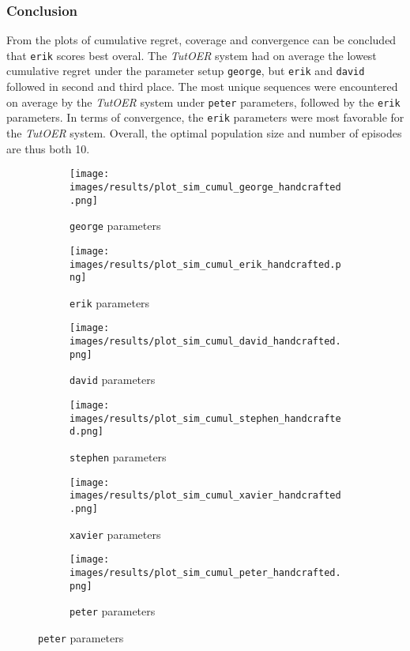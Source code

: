 \subsubsection*{Conclusion}
From the plots of cumulative regret, coverage and convergence can
be concluded that \texttt{erik} scores best overal. The \emph{TutOER} system
had on average the lowest cumulative regret under the parameter setup
\texttt{george}, but \texttt{erik} and \texttt{david} followed in second and
third place. The most unique sequences were encountered on average by the
\emph{TutOER} system under \texttt{peter} parameters, followed by the
\texttt{erik} parameters. In terms of convergence, the \texttt{erik} parameters
were most favorable for the \emph{TutOER} system. Overall, the optimal
population size and number of episodes are thus both 10.
\begin{figure}[ht]
	\begin{subfigure}{0.48\linewidth}
	\texttt{[image: images/results/plot\_sim\_cumul\_george\_handcrafted.png]}
	\caption{\texttt{george} parameters}
	\label{fig:cumul_handcrafted_george}
	\end{subfigure}
	\hfill
	\begin{subfigure}{0.48\linewidth}
	\texttt{[image: images/results/plot\_sim\_cumul\_erik\_handcrafted.png]}
	\caption{\texttt{erik} parameters}
	\label{fig:cumul_handcrafted_erik}
	\end{subfigure}
	\begin{subfigure}{0.48\linewidth}
	\texttt{[image: images/results/plot\_sim\_cumul\_david\_handcrafted.png]}
	\caption{\texttt{david} parameters}
	\label{fig:cumul_handcrafted_david}
	\end{subfigure}
	\hfill
	\begin{subfigure}{0.48\linewidth}
	\texttt{[image: images/results/plot\_sim\_cumul\_stephen\_handcrafted.png]}
	\caption{\texttt{stephen} parameters}
	\label{fig:cumul_handcrafted_stephen}
	\end{subfigure}
	\begin{subfigure}{0.48\linewidth}
	\texttt{[image: images/results/plot\_sim\_cumul\_xavier\_handcrafted.png]}
	\caption{\texttt{xavier} parameters}
	\label{fig:cumul_handcrafted_xavier}
	\end{subfigure}
	\hfill
	\begin{subfigure}{0.48\linewidth}
	\texttt{[image: images/results/plot\_sim\_cumul\_peter\_handcrafted.png]}
	\caption{\texttt{peter} parameters}

\end{subfigure}
\end{figure}
